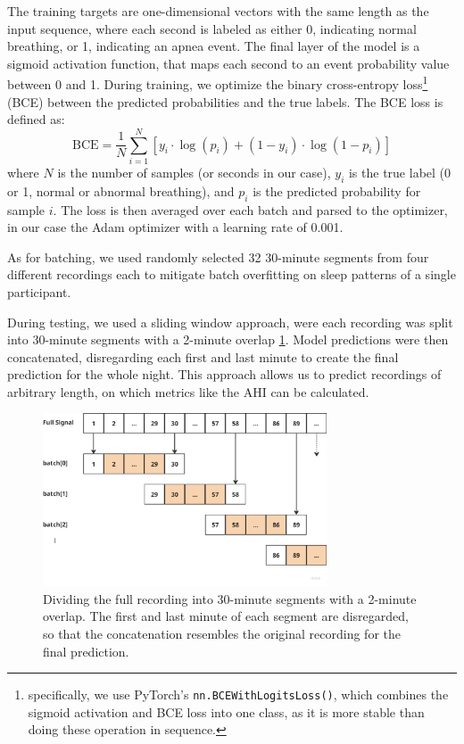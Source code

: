 The training targets are one-dimensional vectors with the same length as the input sequence, where each second is labeled as either 0, indicating normal breathing, or 1, indicating an apnea event. The final layer of the model is a sigmoid activation function, that maps each second to an event probability value between 0 and 1. During training, we optimize the binary cross-entropy loss\footnote{specifically, we use PyTorch's \texttt{nn.BCEWithLogitsLoss()}, which combines the sigmoid activation and BCE loss into one class, as it is more stable than doing these operation in sequence.} (BCE) between the predicted probabilities and the true labels. The BCE loss is defined as:
\begin{equation}
    \text{BCE} = \frac{1}{N}\sum_{i=1}^{N} [ y_i \cdot \log(p_i) + (1 - y_i) \cdot \log(1 - p_i) ]
\end{equation}
where $N$ is the number of samples (or seconds in our case), $y_i$ is the true label (0 or 1, normal or abnormal breathing), and $p_i$ is the predicted probability for sample $i$. The loss is then averaged over each batch and parsed to the optimizer, in our case the Adam optimizer with a learning rate of 0.001.

As for batching, we used randomly selected 32 30-minute segments from four different recordings each to mitigate batch overfitting on sleep patterns of a single participant.

During testing, we used a sliding window approach, were each recording was split into 30-minute segments with a 2-minute overlap \ref{fig:slidingwindow}. Model predictions were then concatenated, disregarding each first and last minute to create the final prediction for the whole night. This approach allows us to predict recordings of arbitrary length, on which metrics like the AHI can be calculated.

\begin{figure}
    \centering
    \includegraphics[width=0.75\textwidth]{images/SlidingWindow}
    \caption{Dividing the full recording into 30-minute segments with a 2-minute overlap. The first and last minute of each segment are disregarded, so that the concatenation resembles the original recording for the final prediction.}
    \label{fig:slidingwindow}
\end{figure}

